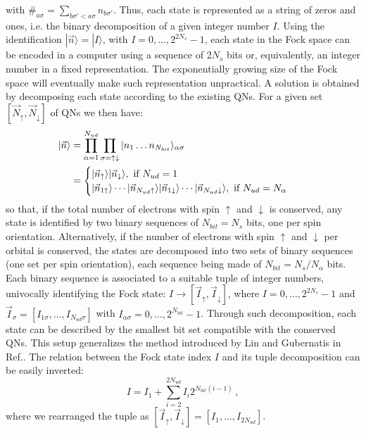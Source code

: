 \documentclass[final,3p,10pt]{elsarticle}
\newcommand{\onlinecite}[1]{\nocite{#1}\hspace{-0.1cm}\citenum{#1}}
\newcommand{\ket}[1]
{|#1\rangle}
\def\a{\alpha}       \def\b{\beta}   \def\g{\gamma}   \def\d{\delta}
\def\up{\uparrow} \def\down{\downarrow} \def\dw{\downarrow}
\begin{document}
with $\#_{a\sigma}=\sum_{b\sigma'<a\sigma} n_{b\sigma'}$. 
Thus, each state is represented as a string of zeros and
ones, i.e. the binary decomposition of a given integer number $I$. Using
the identification $\ket{\vec{n}}=\ket{I}$, with
$I=0,\dots,2^{2N_s}-1$, each state in the Fock space can be encoded in a computer using
a sequence of $2N_s$ bits or, equivalently, an integer number in a
fixed representation.
The exponentially growing size of the Fock space will
eventually make such representation unpractical.
A solution is obtained by decomposing each state according to the
existing QNs. For a given set $[\vec{N}_\up,\vec{N}_\dw]$ of QNs we
then have: 
\begin{equation}
  \begin{split}
  \ket{\vec{n}} &=
  \prod_{\a=1}^{N_{ud}}\prod_{\sigma=\up\dw}\ket{n_1\dots
    n_{N_{bit}}}_{\a\sigma}\cr
  &=
  \begin{cases}
    \ket{\vec{n}_\up}\ket{\vec{n}_\dw},\
    \text{if}\ N_{ud}=1\\
      \ket{\vec{n}_{1\up}}\cdots\ket{\vec{n}_{N_{ud}\up}}
      \ket{\vec{n}_{1\dw}}\cdots\ket{\vec{n}_{N_{ud}\dw}},\
      \text{if}\ N_{ud}=N_\alpha
    \end{cases}
    \end{split}
\end{equation}
so that, if the total number of electrons with spin $\up$ and $\dw$ is 
conserved, any state is identified by two binary sequences of
$N_{bit}=N_s$ bits, one per spin orientation.
Alternatively, if the number of electrons with spin $\up$ and $\dw$ per orbital is conserved, the
states are decomposed into two sets of
binary sequences (one set per spin orientation), each sequence
being made of  $N_{bit}=N_s/N_\alpha$ bits.
Each binary sequence is associated to a suitable tuple
of integer numbers,  univocally identifying the Fock state:
$I \rightarrow [\vec{I}_\up,\vec{I}_\dw]$, 
where $I=0,\dots,2^{2N_s}-1$ and
$\vec{I}_\sigma=[I_{1\sigma},\dots,I_{N_{ud}\sigma}]$ with
$I_{\a\sigma}=0,\dots,2^{N_{bit}}-1$. 
Through such decomposition, each state can be described by the
smallest bit set compatible with the conserved QNs.
This setup generalizes the method introduced by Lin and Gubernatis in
Ref.\onlinecite{Lin1993CIP}. 
The relation
between the Fock state index $I$ and its tuple decomposition can be
easily inverted:
\begin{equation}\label{Irelation}
I = I_1 + \sum_{i=2}^{2N_{ud}}I_i 2^{N_{bit}(i-1)}\,,
\end{equation}
where we rearranged the tuple as $[\vec{I}_\up,\vec{I}_\dw]=[I_1,\dots,I_{2N_{ud}}]$. 
\end{document}
